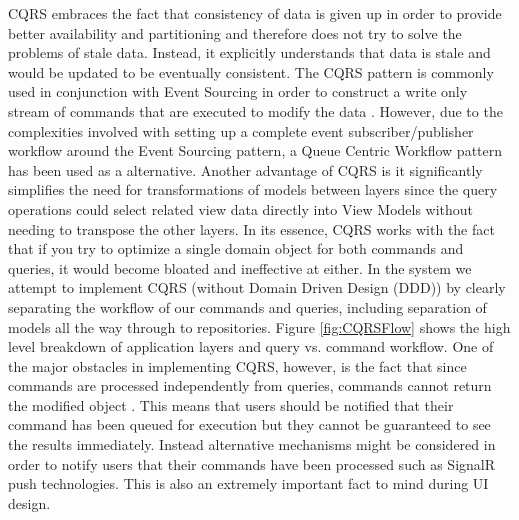 CQRS embraces the fact that consistency of data is given up in order to provide better availability  and partitioning and therefore does not try to solve the problems of stale data. Instead, it explicitly understands that data is stale and would be updated to be eventually consistent. The CQRS pattern is commonly used in conjunction with Event Sourcing in order to construct a write only stream of commands that are executed to modify the data \cite{Homer2014}. However, due to the complexities involved with setting up a complete event subscriber/publisher workflow around the Event Sourcing pattern, a Queue Centric Workflow pattern has been used as a alternative. Another advantage of CQRS is it significantly simplifies the need for transformations of models between layers since the query operations could select related view data directly into View Models without needing to transpose the other layers. In its essence, CQRS works with the fact that if you try to optimize a single domain object for both commands and queries, it would become bloated and ineffective at either. In the system we attempt to implement CQRS (without Domain Driven Design (DDD)) by clearly separating the workflow of our commands and queries, including separation of models all the way through to repositories. Figure \ref{fig:CQRSFlow} shows the high level breakdown of application layers and query vs. command workflow. One of the major obstacles in implementing CQRS, however, is the fact that since commands are processed independently from queries, commands cannot return the modified object \cite{Homer2014}. This means that users should be notified that their command has been queued for execution but they cannot be guaranteed to see the results immediately. Instead alternative mechanisms might be considered in order to notify users that their commands have been processed such as SignalR push technologies. This is also an extremely important fact to mind during UI design.
 
 
